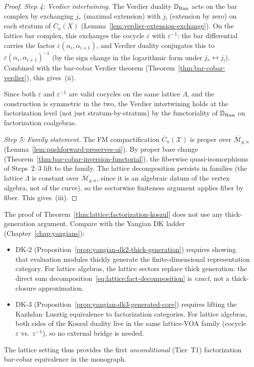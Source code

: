 \begin{proof}
\emph{Step 4: Verdier intertwining.}
The Verdier duality $\mathbb{D}_{\operatorname{Ran}}$ acts on the bar complex
by exchanging $j_*$ (maximal extension) with $j_!$ (extension by
zero) on each stratum of $\overline{C}_n(X)$
(Lemma~\ref{lem:verdier-extension-exchange}).  On the lattice bar
complex, this exchanges the cocycle $\varepsilon$ with
$\varepsilon^{-1}$: the bar differential carries the factor
$\varepsilon(\alpha_i, \alpha_{i+1})$, and Verdier duality
conjugates this to $\varepsilon(\alpha_i, \alpha_{i+1})^{-1}$
(by the sign change in the logarithmic form under
$j_* \leftrightarrow j_!$).  Combined with the bar-cobar
Verdier theorem (Theorem~\ref{thm:bar-cobar-verdier}), this
gives~(ii).

Since both $\varepsilon$ and $\varepsilon^{-1}$ are valid cocycles
on the same lattice $\Lambda$, and the construction is symmetric
in the two, the Verdier intertwining holds at the factorization
level (not just stratum-by-stratum) by the functoriality of
$\mathbb{D}_{\operatorname{Ran}}$ on factorization coalgebras.

\emph{Step 5: Family statement.}
The FM compactification $\overline{C}_n(\mathcal{X})$ is proper over
$\overline{\mathcal{M}}_{g,n}$
(Lemma~\ref{lem:pushforward-preserves-qi}).  By proper base change
(Theorem~\ref{thm:bar-cobar-inversion-functorial}), the fiberwise
quasi-isomorphisms of Steps~2--3 lift to the family.  The lattice
decomposition persists in families (the lattice $\Lambda$ is
constant over $\overline{\mathcal{M}}_{g,n}$, since it is an algebraic
datum of the vertex algebra, not of the curve), so the sectorwise
finiteness argument applies fiber by fiber.  This gives~(iii).
\end{proof}

\begin{remark}
\label{rem:lattice:no-thick-generation}
The proof of
Theorem~\ref{thm:lattice:factorization-koszul} does not use any
thick-generation argument.  Compare with the Yangian DK ladder
(Chapter~\ref{chap:yangians}):
\begin{itemize}
\item DK-2 (Proposition~\ref{prop:yangian-dk2-thick-generation})
  requires showing that evaluation modules thickly generate the
  finite-dimensional representation category.  For lattice algebras,
  the lattice sectors replace thick generation: the direct sum
  decomposition~\eqref{eq:lattice:fact-decomposition} is
  \emph{exact}, not a thick-closure approximation.
\item DK-3 (Proposition~\ref{prop:yangian-dk3-generated-core})
  requires lifting the Kazhdan--Lusztig equivalence to factorization
  categories.  For lattice algebras, both sides of the Koszul duality
  live in the same lattice-VOA family (cocycle
  $\varepsilon$ vs.\ $\varepsilon^{-1}$), so no external bridge
  is needed.
\end{itemize}
The lattice setting thus provides the first \emph{unconditional}
(Tier~T1) factorization bar-cobar equivalence in the monograph.
\end{remark}


